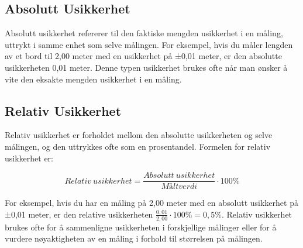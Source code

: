 \subsection{Absolutt Usikkerhet}

Absolutt usikkerhet refererer til den faktiske mengden usikkerhet i en måling, uttrykt i samme enhet som selve målingen. For eksempel, hvis du måler lengden av et bord til 2,00 meter med en usikkerhet på ±0,01 meter, er den absolutte usikkerheten 0,01 meter. Denne typen usikkerhet brukes ofte når man ønsker å vite den eksakte mengden usikkerhet i en måling.

\subsection{Relativ Usikkerhet}

Relativ usikkerhet er forholdet mellom den absolutte usikkerheten og selve målingen, og den uttrykkes ofte som en prosentandel. Formelen for relativ usikkerhet er:

\begin{equation}
	\label{eqn:relUsikkerhet}
		 	Relativ\ usikkerhet = \frac{Absolutt\ usikkerhet}{M \text{å}lt verdi} \cdot 100 \%
\end{equation}



For eksempel, hvis du har en måling på 2,00 meter med en absolutt usikkerhet på ±0,01 meter, er den relative usikkerheten $\frac{0,01}{2,00} \cdot 100 \% = 0,5\%$. Relativ usikkerhet brukes ofte for å sammenligne usikkerheten i forskjellige målinger eller for å vurdere nøyaktigheten av en måling i forhold til størrelsen på målingen.